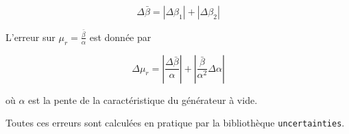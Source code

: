 \begin{equation}
    \Delta \bar{\beta} = \left|\Delta \beta_1\right| + \left|\Delta \beta_2\right|
\end{equation}

L'erreur sur \(\mu_r = \frac{\bar{\beta}}{\alpha}\) est donnée par

\begin{equation}
    \Delta\mu_r = \left|\frac{\Delta\bar{\beta}}{\alpha}\right| + \left|\frac{\bar{\beta}}{\alpha^2} \Delta\alpha\right|
\end{equation}

où \(\alpha\) est la pente de la caractéristique du générateur à vide.

Toutes ces erreurs sont calculées en pratique par la bibliothèque \texttt{uncertainties}.
